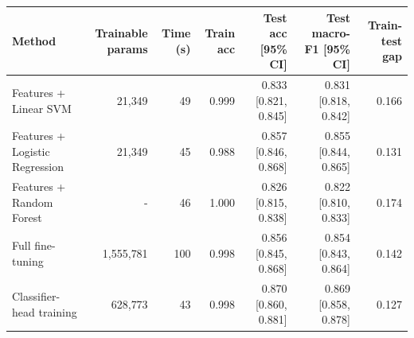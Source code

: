 \begin{tabular}{lrrrrrr}
\toprule
Method & Trainable params & Time (s) & Train acc & Test acc [95\% CI] & Test macro-F1 [95\% CI] & Train-test gap \\
\midrule
Features + Linear SVM & 21{,}349 & 49 & 0.999 & 0.833 [0.821, 0.845] & 0.831 [0.818, 0.842] & 0.166 \\
Features + Logistic Regression & 21{,}349 & 45 & 0.988 & 0.857 [0.846, 0.868] & 0.855 [0.844, 0.865] & 0.131 \\
Features + Random Forest & - & 46 & 1.000 & 0.826 [0.815, 0.838] & 0.822 [0.810, 0.833] & 0.174 \\
Full fine-tuning & 1{,}555{,}781 & 100 & 0.998 & 0.856 [0.845, 0.868] & 0.854 [0.843, 0.864] & 0.142 \\
Classifier-head training & 628{,}773 & 43 & 0.998 & 0.870 [0.860, 0.881] & 0.869 [0.858, 0.878] & 0.127 \\
\bottomrule
\end{tabular}

